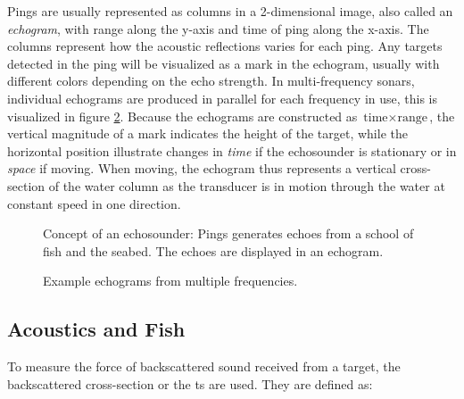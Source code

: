     Pings are usually represented as columns in a 2-dimensional image, also called an \textit{echogram}, with range along the y-axis and time of ping along the x-axis. The columns represent how the acoustic reflections varies for each ping. Any targets detected in the ping will be visualized as a mark in the echogram, usually with different colors depending on the echo strength. In multi-frequency sonars, individual echograms are produced in parallel for each frequency in use, this is visualized in figure \ref{echogram_example_fig}. Because the echograms are constructed as $\text{time} \times \text{range}$, the vertical magnitude of a mark indicates the height of the target, while the horizontal position illustrate changes in \textit{time} if the echosounder is stationary or in \textit{space} if moving. When moving, the echogram thus represents a vertical cross-section of the water column as the transducer is in motion through the water at constant speed in one direction\cite{simmonds2008fisheries}.
    
    
    \begin{figure}[H]
        \centering
            
        \caption[Echosounder]{Concept of an echosounder: Pings generates echoes from a school of fish and the seabed. The echoes are displayed in an echogram.}
      	\medskip 
        \label{echogram}
    \end{figure}
    
    \begin{figure}[H]
        \centering
            
        \caption[Echosounder]{Example echograms from multiple frequencies.}
      	\medskip 
        \label{echogram_example_fig}
    \end{figure}

    
\subsection{Acoustics and Fish}
    To measure the force of backscattered sound received from a target, the backscattered cross-section or the \gls{ts} are used. They are defined as:
    
